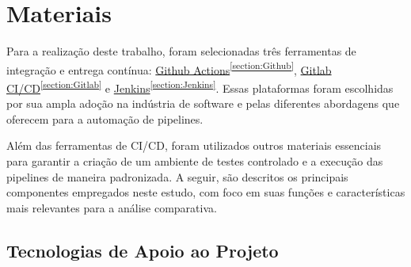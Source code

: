 
\chapter{Materiais}\label{cap:materialemetodos}

Para a realização deste trabalho, foram selecionadas três ferramentas de integração e entrega contínua: 
\hyperref[section:Github]{Github Actions}{\textsuperscript{\ref{section:Github}}}, 
\hyperref[section:Gitlab]{Gitlab CI/CD}{\textsuperscript{\ref{section:Gitlab}}} e \hyperref[section:Jenkins]{Jenkins}{\textsuperscript{\ref{section:Jenkins}}}. Essas plataformas foram escolhidas por sua ampla adoção na indústria de software e pelas diferentes abordagens que oferecem para a automação de pipelines.

Além das ferramentas de CI/CD, foram utilizados outros materiais essenciais para garantir a criação de um ambiente de testes controlado e a execução das pipelines de maneira padronizada. A seguir, são descritos os principais componentes empregados neste estudo, com foco em suas funções e características mais relevantes para a análise comparativa.

\section{Tecnologias de Apoio ao Projeto}

